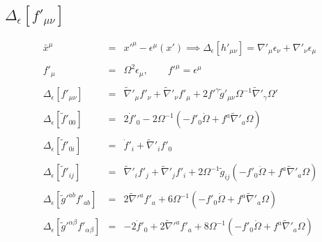 \documentclass[10pt,letterpaper]{article}
\numberwithin{equation}{section}
\begin{document}
\subsection{$\Delta_{\epsilon}[f'_{\mu\nu}]$}
\begin{eqnarray}
\bar x^\mu &=&  x'^\mu - \epsilon^\mu(x') \implies \Delta_\epsilon \left[ h'_{\mu\nu}\right] = \nabla'_\mu \epsilon_\nu +\nabla'_\nu \epsilon_\mu
\label{gaugetrans2}
\\ \nonumber\\
f'_{\mu} &=& \Omega^2 \epsilon_\mu,\qquad f'^\mu = \epsilon^\mu
\\ \nonumber\\
\Delta_\epsilon\left[ f'_{\mu\nu} \right]  &=& \tilde\nabla'_{\mu }f'_{\nu} + \tilde\nabla'_{\nu}f'_{\mu} + 2 f'^{\gamma } \tilde g'_{\mu\nu} \Omega^{-1} \tilde\nabla'_{\gamma }\Omega '
\\ \nonumber\\
\Delta_\epsilon\left[ \tilde f'_{00} \right] &=&  2\dot f'_0 - 2\Omega^{-1} \left( -f'_0 \dot \Omega + f^a\tilde\nabla'_a \Omega\right) 
\\ \nonumber\\
\Delta_\epsilon\left[ \tilde f'_{0i} \right]  &=&  \dot f'_i + \tilde\nabla'_i f'_0
\\ \nonumber\\
\Delta_\epsilon\left[ \tilde f'_{ij}  \right]  &=& \tilde\nabla'_{i }f'_{j } + \tilde\nabla'_{j}f'_{i} + 2\Omega^{-1} \tilde g_{ij} \left( -f'_0 \dot \Omega + f^a\tilde\nabla'_a \Omega\right) 
\\ \nonumber\\
\Delta_\epsilon\left[ \tilde g'^{ab} f'_{ab} \right]  &=& 2\tilde\nabla'^a f'_a + 6\Omega^{-1} \left( -f'_0 \dot \Omega + f^a\tilde\nabla'_a \Omega\right) 
\\ \nonumber\\
\Delta_\epsilon\left[ \tilde g'^{\alpha\beta} f'_{\alpha\beta} \right]  &=& -2\dot f'_0+ 2\tilde\nabla'^a f'_a + 8\Omega^{-1} \left( -f'_0 \dot \Omega + f^a\tilde\nabla'_a \Omega\right)
\end{eqnarray}
\end{document}
